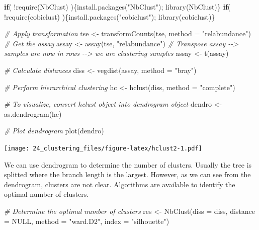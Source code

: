 \documentclass[
]{book}
\newenvironment{Shaded}{\begin{snugshade}}{\end{snugshade}}
\newcommand{\AttributeTok}[1]{\textcolor[rgb]{0.77,0.63,0.00}{#1}}
\newcommand{\CommentTok}[1]{\textcolor[rgb]{0.56,0.35,0.01}{\textit{#1}}}
\newcommand{\ConstantTok}[1]{\textcolor[rgb]{0.00,0.00,0.00}{#1}}
\newcommand{\ControlFlowTok}[1]{\textcolor[rgb]{0.13,0.29,0.53}{\textbf{#1}}}
\newcommand{\FunctionTok}[1]{\textcolor[rgb]{0.00,0.00,0.00}{#1}}
\newcommand{\NormalTok}[1]{#1}
\newcommand{\OtherTok}[1]{\textcolor[rgb]{0.56,0.35,0.01}{#1}}
\newcommand{\SpecialCharTok}[1]{\textcolor[rgb]{0.00,0.00,0.00}{#1}}
\newcommand{\StringTok}[1]{\textcolor[rgb]{0.31,0.60,0.02}{#1}}
\begin{document}
\begin{Shaded}
\begin{Highlighting}[]
\ControlFlowTok{if}\NormalTok{( }\SpecialCharTok{!}\FunctionTok{require}\NormalTok{(NbClust) )\{}\FunctionTok{install.packages}\NormalTok{(}\StringTok{"NbClust"}\NormalTok{); }\FunctionTok{library}\NormalTok{(NbClust)\}}
\ControlFlowTok{if}\NormalTok{( }\SpecialCharTok{!}\FunctionTok{require}\NormalTok{(cobiclust) )\{}\FunctionTok{install.packages}\NormalTok{(}\StringTok{"cobiclust"}\NormalTok{); }\FunctionTok{library}\NormalTok{(cobiclust)\}}

\CommentTok{\# Apply transformation}
\NormalTok{tse }\OtherTok{\textless{}{-}} \FunctionTok{transformCounts}\NormalTok{(tse, }\AttributeTok{method =} \StringTok{"relabundance"}\NormalTok{)}
\CommentTok{\# Get the assay}
\NormalTok{assay }\OtherTok{\textless{}{-}} \FunctionTok{assay}\NormalTok{(tse, }\StringTok{"relabundance"}\NormalTok{)}
\CommentTok{\# Transpose assay {-}{-}\textgreater{} samples are now in rows {-}{-}\textgreater{} we are clustering samples}
\NormalTok{assay }\OtherTok{\textless{}{-}} \FunctionTok{t}\NormalTok{(assay)}

\CommentTok{\# Calculate distances}
\NormalTok{diss }\OtherTok{\textless{}{-}} \FunctionTok{vegdist}\NormalTok{(assay, }\AttributeTok{method =} \StringTok{"bray"}\NormalTok{)}

\CommentTok{\# Perform hierarchical clustering}
\NormalTok{hc }\OtherTok{\textless{}{-}} \FunctionTok{hclust}\NormalTok{(diss, }\AttributeTok{method =} \StringTok{"complete"}\NormalTok{)}

\CommentTok{\# To visualize, convert hclust object into dendrogram object}
\NormalTok{dendro }\OtherTok{\textless{}{-}} \FunctionTok{as.dendrogram}\NormalTok{(hc)}

\CommentTok{\# Plot dendrogram}
\FunctionTok{plot}\NormalTok{(dendro)}
\end{Highlighting}
\end{Shaded}

\texttt{[image: 24\_clustering\_files/figure-latex/hclust2-1.pdf]}

We can use dendrogram to determine the number of clusters. Usually the
tree is splitted where the branch length is the largest. However, as
we can see from the dendrogram, clusters are not clear. Algorithms are
available to identify the optimal number of clusters.

\begin{Shaded}
\begin{Highlighting}[]
\CommentTok{\# Determine the optimal number of clusters}
\NormalTok{res }\OtherTok{\textless{}{-}} \FunctionTok{NbClust}\NormalTok{(}\AttributeTok{diss =}\NormalTok{ diss, }\AttributeTok{distance =} \ConstantTok{NULL}\NormalTok{, }\AttributeTok{method =} \StringTok{"ward.D2"}\NormalTok{,}
               \AttributeTok{index =} \StringTok{"silhouette"}\NormalTok{)}
\end{Highlighting}
\end{Shaded}
\end{document}
